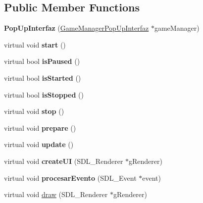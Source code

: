 \subsection*{Public Member Functions}
\begin{DoxyCompactItemize}
\item 
{\bfseries Pop\+Up\+Interfaz} (\hyperlink{class_game_manager_pop_up_interfaz}{Game\+Manager\+Pop\+Up\+Interfaz} $\ast$game\+Manager)\hypertarget{class_pop_up_interfaz_ae86fafc4a96b5ad4598f6b871ee0b80b}{}\label{class_pop_up_interfaz_ae86fafc4a96b5ad4598f6b871ee0b80b}

\item 
virtual void {\bfseries start} ()\hypertarget{class_pop_up_interfaz_ad0ea581e8df5b64fd9500cbcf28656c9}{}\label{class_pop_up_interfaz_ad0ea581e8df5b64fd9500cbcf28656c9}

\item 
virtual bool {\bfseries is\+Paused} ()\hypertarget{class_pop_up_interfaz_a359ff19ee2c3bd32d58d6893696c65fb}{}\label{class_pop_up_interfaz_a359ff19ee2c3bd32d58d6893696c65fb}

\item 
virtual bool {\bfseries is\+Started} ()\hypertarget{class_pop_up_interfaz_a66280a78feebd2443f140b3df8647616}{}\label{class_pop_up_interfaz_a66280a78feebd2443f140b3df8647616}

\item 
virtual bool {\bfseries is\+Stopped} ()\hypertarget{class_pop_up_interfaz_af1a1f054faea40813866f74513e65484}{}\label{class_pop_up_interfaz_af1a1f054faea40813866f74513e65484}

\item 
virtual void {\bfseries stop} ()\hypertarget{class_pop_up_interfaz_ab85113ec1af869a1d5d7ea45f52f313b}{}\label{class_pop_up_interfaz_ab85113ec1af869a1d5d7ea45f52f313b}

\item 
virtual void {\bfseries prepare} ()\hypertarget{class_pop_up_interfaz_a174c9a8f6e4dbf2adfb3a362345a0cad}{}\label{class_pop_up_interfaz_a174c9a8f6e4dbf2adfb3a362345a0cad}

\item 
virtual void {\bfseries update} ()\hypertarget{class_pop_up_interfaz_a4c2d2acd5f27868289423c07835c95cd}{}\label{class_pop_up_interfaz_a4c2d2acd5f27868289423c07835c95cd}

\item 
virtual void {\bfseries create\+UI} (S\+D\+L\+\_\+\+Renderer $\ast$g\+Renderer)\hypertarget{class_pop_up_interfaz_aecc52811ccad5f20e85be0d6991d399f}{}\label{class_pop_up_interfaz_aecc52811ccad5f20e85be0d6991d399f}

\item 
virtual void {\bfseries procesar\+Evento} (S\+D\+L\+\_\+\+Event $\ast$event)\hypertarget{class_pop_up_interfaz_acd7418d2edadaf261076f0839bfc4e5c}{}\label{class_pop_up_interfaz_acd7418d2edadaf261076f0839bfc4e5c}

\item 
virtual void \hyperlink{class_pop_up_interfaz_acd9384b541df0cb1d075cef6f6b88708}{draw} (S\+D\+L\+\_\+\+Renderer $\ast$g\+Renderer)
\end{DoxyCompactItemize}
